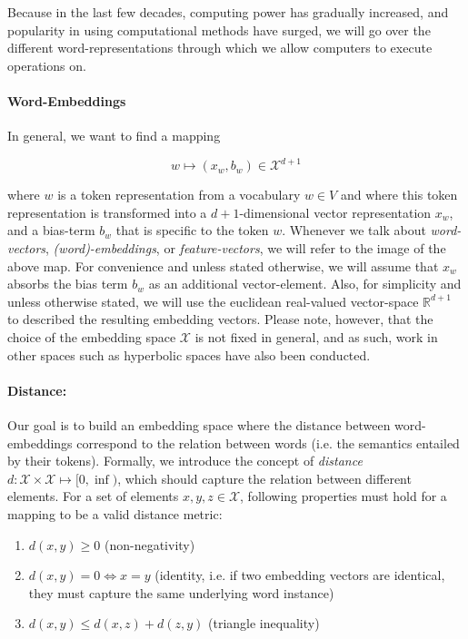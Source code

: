 \documentclass[a4paper,12pt,twoside,openright]{report}
\begin{document}
Because in the last few decades, computing power has gradually increased, and popularity in using computational methods have surged, we will go over the different word-representations through which we allow computers to execute operations on.

\paragraph{Word-Embeddings}
In general, we want to find a mapping 

\begin{equation}
\label{map:embedding_mapping}
w \mapsto (x_w, b_w) \in \mathcal{X}^{d + 1}
\end{equation}

where $w$ is a token representation from a vocabulary $w \in V$ and where this token representation is transformed into a $d+1$-dimensional vector representation $x_w$, and a bias-term $b_w$ that is specific to the token $w$.
Whenever we talk about \textit{word-vectors}, \textit{(word)-embeddings}, or \textit{feature-vectors}, we will refer to the image of the above map. 
For convenience and unless stated otherwise, we will assume that $x_w$ absorbs the bias term $b_w$ as an additional vector-element.
Also, for simplicity and unless otherwise stated, we will use the euclidean real-valued vector-space $\mathbb{R}^{d+1}$ to described the resulting embedding vectors.
Please note, however, that the choice of the embedding space $\mathcal{X}$ is not fixed in general, and as such, work in other spaces such as hyperbolic spaces  \cite{ganea18} have also been conducted. 

\paragraph{Distance:} Our goal is to build an embedding space where the distance between word-embeddings correspond to the relation between words (i.e. the semantics entailed by their tokens).
Formally, we introduce the concept of \textit{distance} $d : \mathcal{X}  \times \mathcal{X} \mapsto [ 0, \inf )$, which should capture the relation between different elements. 
For a set of elements $x, y, z \in \mathcal{X}$, following properties must hold for a mapping to be a valid distance metric:

\begin{enumerate}
\item $d(x, y) \geq 0$ (non-negativity)
\item $d(x, y) = 0 \iff x = y$ (identity, i.e. if two embedding vectors are identical, they must capture the same underlying word instance)
\item $d(x, y) \leq d(x, z) + d(z, y)$ (triangle inequality)
\end{enumerate}{\label{def:distance}}
\end{document}
